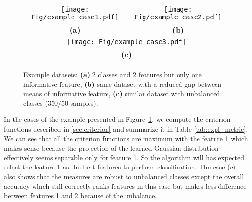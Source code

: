 \documentclass[a4paper,11pt,DIV=16]{scrartcl}
\begin{document}
    \begin{figure}[!ht]
        \centering
        \begin{tabular}{cc}
            \texttt{[image: Fig/example\_case1.pdf]} &
            \texttt{[image: Fig/example\_case2.pdf]} \\
            {\bfseries{(a)}} & {\bfseries{(b)}} \\
            \multicolumn{2}{c}{\texttt{[image: Fig/example\_case3.pdf]}} \\
            \multicolumn{2}{c}{{\bfseries{(c)}}} \\
        \end{tabular}
        \caption{Example datasets: {\bfseries{(a)}} 2 classes and 2 features but only one informative feature, {\bfseries{(b)}} same dataset with a reduced gap between means of informative feature, {\bfseries{(c)}} similar dataset with unbalanced classes (350/50 samples).\label{fig:expl_dataset}}
    \end{figure}

    In the cases of the example presented in Figure~\ref{fig:expl_dataset}, we compute the criterion functions described in \ref{sec:criterion} and summarize it in Table \ref{tab:expl_metric}. We can see that all the criterion functions are maximum with the feature 1 which makes sense because the projection of the learned Gaussian distribution effectively seems separable only for feature 1. So the algorithm will has expected select the feature 1 as the best features to perform classification. The case (c) also shows that the measures are robust to unbalanced classes except the overall accuracy which still correctly ranks features in this case but makes less difference between features 1 and 2 because of the imbalance.
\end{document}
